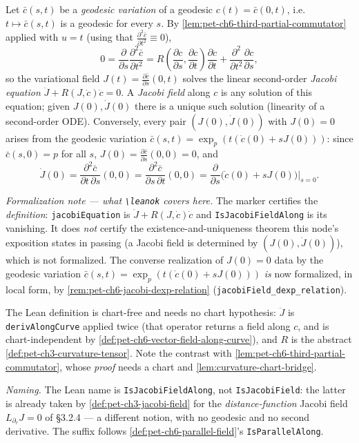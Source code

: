 \begin{definition}
  \label{def:pet-ch6-jacobi-field}
  \leanok
  Let $\bar c(s,t)$ be a \emph{geodesic variation} of a geodesic $c(t)=\bar
  c(0,t)$, i.e.\ $t\mapsto\bar c(s,t)$ is a geodesic for every $s$. By
  \cref{lem:pet-ch6-third-partial-commutator} applied with $u=t$ (using that
  $\frac{\partial^2\bar c}{\partial t^2}\equiv0$),
  \[
    0=\frac{\partial}{\partial s}\frac{\partial^2\bar c}{\partial t^2}
    =R\!\left(\frac{\partial c}{\partial s},\frac{\partial c}{\partial t}\right)
    \frac{\partial c}{\partial t}+\frac{\partial^2}{\partial t^2}\frac{\partial c}{\partial s},
  \]
  so the variational field $J(t)=\frac{\partial\bar c}{\partial s}(0,t)$ solves
  the linear second-order \emph{Jacobi equation} $\ddot J+R(J,\dot c)\dot c=0$.
  A \emph{Jacobi field} along $c$ is any solution of this equation; given
  $J(0),\dot J(0)$ there is a unique such solution (linearity of a second-order
  ODE). Conversely, every pair $(J(0),\dot J(0))$ with $J(0)=0$ arises from the
  geodesic variation $\bar c(s,t)=\exp_p(t(\dot c(0)+sJ(0)))$: since
  $\bar c(s,0)=p$ for all $s$, $J(0)=\frac{\partial\bar c}{\partial s}(0,0)=0$,
  and
  \[
    \dot J(0)=\frac{\partial^2\bar c}{\partial t\,\partial s}(0,0)
    =\frac{\partial^2\bar c}{\partial s\,\partial t}(0,0)
    =\frac{\partial}{\partial s}\big(\dot c(0)+sJ(0)\big)\Big|_{s=0}.
  \]

  \emph{Formalization note — what \texttt{\textbackslash leanok} covers here.} The marker
  certifies the \emph{definition}: \texttt{jacobiEquation} is $\ddot J+R(J,\dot c)\dot c$
  and \texttt{IsJacobiFieldAlong} is its vanishing. It does \emph{not} certify the
  existence-and-uniqueness theorem this node's exposition states in passing (a Jacobi field
  is determined by $(J(0),\dot J(0))$), which is not formalized. The converse realization of
  $J(0)=0$ data by the geodesic variation $\bar c(s,t)=\exp_p(t(\dot c(0)+sJ(0)))$ \emph{is}
  now formalized, in local form, by \cref{rem:pet-ch6-jacobi-dexp-relation}
  (\texttt{jacobiField\_dexp\_relation}).

  The Lean definition is chart-free and needs no chart hypothesis: $\ddot J$ is
  \texttt{derivAlongCurve} applied twice (that operator returns a field along $c$, and is
  chart-independent by \cref{def:pet-ch6-vector-field-along-curve}), and $R$ is the abstract
  \cref{def:pet-ch3-curvature-tensor}. Note the contrast with
  \cref{lem:pet-ch6-third-partial-commutator}, whose \emph{proof} needs a chart and
  \cref{lem:curvature-chart-bridge}.

  \emph{Naming.} The Lean name is \texttt{IsJacobiFieldAlong}, not
  \texttt{IsJacobiField}: the latter is already taken by \cref{def:pet-ch3-jacobi-field}
  for the \emph{distance-function} Jacobi field $L_{\partial_r}J=0$ of §3.2.4 — a different
  notion, with no geodesic and no second derivative. The suffix follows
  \cref{def:pet-ch6-parallel-field}'s \texttt{IsParallelAlong}.
\end{definition}

